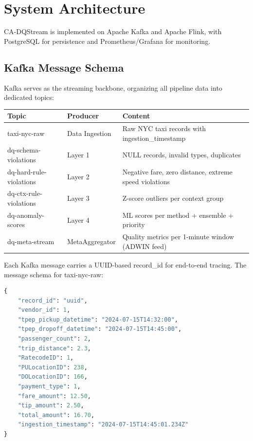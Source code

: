 \section{System Architecture}

CA-DQStream is implemented on Apache Kafka and Apache Flink, with PostgreSQL for persistence and Prometheus/Grafana for monitoring.

\subsection{Kafka Message Schema}

Kafka serves as the streaming backbone, organizing all pipeline data into dedicated topics:

\begin{longtable}{|m{3.5cm}|m{4.5cm}|m{5cm}|}
\hline
\textbf{Topic} & \textbf{Producer} & \textbf{Content} \\ \hline
taxi-nyc-raw & Data Ingestion & Raw NYC taxi records with ingestion\_timestamp \\ \hline
dq-schema-violations & Layer 1 & NULL records, invalid types, duplicates \\ \hline
dq-hard-rule-violations & Layer 2 & Negative fare, zero distance, extreme speed violations \\ \hline
dq-ctx-rule-violations & Layer 3 & Z-score outliers per context group \\ \hline
dq-anomaly-scores & Layer 4 & ML scores per method + ensemble + priority \\ \hline
dq-meta-stream & MetaAggregator & Quality metrics per 1-minute window (ADWIN feed) \\ \hline
\end{longtable}

Each Kafka message carries a UUID-based record\_id for end-to-end tracing. The message schema for taxi-nyc-raw:

\begin{lstlisting}[language=Python]
{
    "record_id": "uuid",
    "vendor_id": 1,
    "tpep_pickup_datetime": "2024-07-15T14:32:00",
    "tpep_dropoff_datetime": "2024-07-15T14:45:00",
    "passenger_count": 2,
    "trip_distance": 2.3,
    "RatecodeID": 1,
    "PULocationID": 238,
    "DOLocationID": 166,
    "payment_type": 1,
    "fare_amount": 12.50,
    "tip_amount": 2.50,
    "total_amount": 16.70,
    "ingestion_timestamp": "2024-07-15T14:45:01.234Z"
}
\end{lstlisting}

